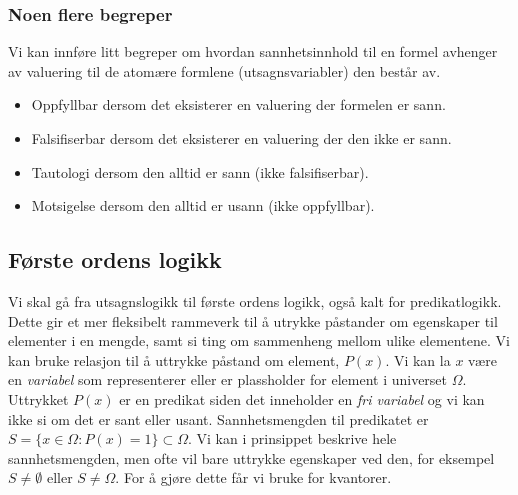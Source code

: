 \subsubsection{Noen flere begreper}
Vi kan innføre litt begreper om hvordan sannhetsinnhold til en formel avhenger av valuering til de atomære formlene (utsagnsvariabler) den består av.
\begin{itemize}
\item Oppfyllbar dersom det eksisterer en valuering der formelen er sann.
\item Falsifiserbar dersom det eksisterer en valuering der den ikke er sann.
\item Tautologi dersom den alltid er sann (ikke falsifiserbar).
\item Motsigelse dersom den alltid er usann (ikke oppfyllbar).
\end{itemize}
\subsection{Første ordens logikk}
Vi skal gå fra utsagnslogikk til første ordens logikk, også kalt for predikatlogikk. Dette gir et mer fleksibelt rammeverk til å utrykke påstander om egenskaper til elementer i en mengde, samt si ting om sammenheng mellom ulike elementene. Vi kan bruke relasjon til å uttrykke påstand om element, $P(x)$. Vi kan la $x$ være en \textit{variabel} som representerer eller er plassholder for element i universet $\Omega$. Uttrykket $P(x)$ er en predikat siden det inneholder en \textit{fri variabel} og vi kan ikke si om det er sant eller usant. Sannhetsmengden til predikatet er $S = \{x \in \Omega:P(x)=1\}\subset \Omega$. Vi kan i prinsippet beskrive hele sannhetsmengden, men ofte vil bare uttrykke egenskaper ved den, for eksempel $S \neq \emptyset$ eller $S \neq \Omega$. For å gjøre dette får vi bruke for kvantorer.
